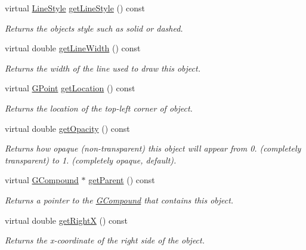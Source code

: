\begin{DoxyCompactItemize}
virtual \mbox{\hyperlink{classsgl_1_1GObject_a86e0f5648542856159bb40775c854aa7}{Line\+Style}} \mbox{\hyperlink{classsgl_1_1GObject_aaf1f5ea8281e5e3486662878d26f0a13}{get\+Line\+Style}} () const
\begin{DoxyCompactList}\small\item\em Returns the object\textquotesingle{}s style such as solid or dashed. \end{DoxyCompactList}\item 
virtual double \mbox{\hyperlink{classsgl_1_1GObject_a85ff266dc3eb63d9f2d8e5a4487fd3c0}{get\+Line\+Width}} () const
\begin{DoxyCompactList}\small\item\em Returns the width of the line used to draw this object. \end{DoxyCompactList}\item 
virtual \mbox{\hyperlink{structsgl_1_1GPoint}{G\+Point}} \mbox{\hyperlink{classsgl_1_1GObject_a4f83802015511edeb63b892830812c11}{get\+Location}} () const
\begin{DoxyCompactList}\small\item\em Returns the location of the top-\/left corner of object. \end{DoxyCompactList}\item 
virtual double \mbox{\hyperlink{classsgl_1_1GObject_a1ae3fc278cc5b71b9f2d96a8a83cdf26}{get\+Opacity}} () const
\begin{DoxyCompactList}\small\item\em Returns how opaque (non-\/transparent) this object will appear from 0. (completely transparent) to 1. (completely opaque, default). \end{DoxyCompactList}\item 
virtual \mbox{\hyperlink{classsgl_1_1GCompound}{G\+Compound}} $\ast$ \mbox{\hyperlink{classsgl_1_1GObject_a3e53cef70541b1a14eade4ad0984d0b4}{get\+Parent}} () const
\begin{DoxyCompactList}\small\item\em Returns a pointer to the {\ttfamily \mbox{\hyperlink{classsgl_1_1GCompound}{G\+Compound}}} that contains this object. \end{DoxyCompactList}\item 
virtual double \mbox{\hyperlink{classsgl_1_1GObject_a798cc79daaa10145b28f60bcdfdb0ee9}{get\+RightX}} () const
\begin{DoxyCompactList}\small\item\em Returns the {\itshape x}-\/coordinate of the right side of the object. \end{DoxyCompactList}\item 

\end{DoxyCompactItemize}
